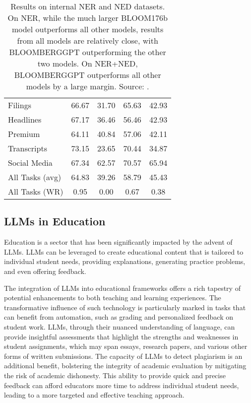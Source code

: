 \begin{table}[h!]
\begin{tabularx}{\textwidth}{Xcccc}
		Filings         & 66.67                 & 31.70             & 65.63                           & 42.93                              \\
		Headlines       & 67.17                 & 36.46             & 56.46                           & 42.93                              \\
		Premium         & 64.11                 & 40.84             & 57.06                           & 42.11                              \\
		Transcripts     & 73.15                 & 23.65             & 70.44                           & 34.87                              \\
		Social Media    & 67.34                 & 62.57             & 70.57                           & 65.94                              \\
		\midrule
		All Tasks (avg) & 64.83                 & 39.26             & 58.79                           & 45.43                              \\
		All Tasks (WR)  & 0.95                  & 0.00              & 0.67                            & 0.38                               \\
		\bottomrule
	\end{tabularx}
	\caption{Results on internal NER and NED datasets. On NER, while the much larger BLOOM176b model outperforms all other models, results from all models are relatively close, with BLOOMBERGGPT outperforming the other two models. On NER+NED, BLOOMBERGGPT outperforms all other models by a large margin. Source: \protect\textcite{wu2023bloomberggpt}.}
	\label{tab:ner_ned_results}
\end{table}

\subsection{LLMs in Education}
\label{subsec:llms-in-education}

Education is a sector that has been significantly impacted by the advent of LLMs. LLMs can be leveraged to create educational content that is tailored to individual student needs, providing explanations, generating practice problems, and even offering feedback.

The integration of LLMs into educational frameworks offers a rich tapestry of potential enhancements to both teaching and learning experiences.
The transformative influence of such technology is particularly marked in tasks that can benefit from automation, such as grading and personalized feedback on student work.
LLMs, through their nuanced understanding of language, can provide insightful assessments that highlight the strengths and weaknesses in student assignments, which may span essays, research papers, and various other forms of written submissions.
The capacity of LLMs to detect plagiarism is an additional benefit, bolstering the integrity of academic evaluation by mitigating the risk of academic dishonesty.
This ability to provide quick and precise feedback can afford educators more time to address individual student needs, leading to a more targeted and effective teaching approach.

